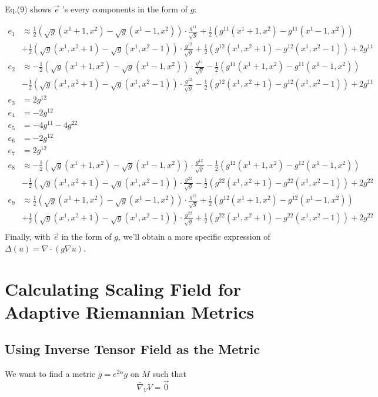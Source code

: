 \documentclass{article}
\theoremstyle{definition}
\theoremstyle{plain}
\begin{document}
Eq.(9) shows $\vec{e}$ 's every components in the form of $ g$:

\begin{align}
    e_1&\approx\frac{1}{2}(\sqrt{g}(x^1+1,x^2)-\sqrt{g}(x^1-1,x^2))\cdot\frac{g^{11}}{\sqrt{g}}+\frac{1}{2}(g^{11}(x^1+1,x^2)-g^{11}(x^1-1,x^2))\\ \nonumber
    &+\frac{1}{2}(\sqrt{g}(x^1,x^2+1)-\sqrt{g}(x^1,x^2-1))\cdot\frac{g^{12}}{\sqrt{g}}+\frac{1}{2}(g^{12}(x^1,x^2+1)-g^{12}(x^1,x^2-1))+2g^{11}\\ \nonumber
    e_2&\approx-\frac{1}{2}(\sqrt{g}(x^1+1,x^2)-\sqrt{g}(x^1-1,x^2))\cdot\frac{g^{11}}{\sqrt{g}}-\frac{1}{2}(g^{11}(x^1+1,x^2)-g^{11}(x^1-1,x^2))\\ \nonumber
    &-\frac{1}{2}(\sqrt{g}(x^1,x^2+1)-\sqrt{g}(x^1,x^2-1))\cdot\frac{g^{12}}{\sqrt{g}}-\frac{1}{2}(g^{12}(x^1,x^2+1)-g^{12}(x^1,x^2-1))+2g^{11}\\ \nonumber
    e_3&=2 g^{12}\\ \nonumber
    e_4&=-2 g^{12}\\ \nonumber
    e_5&=-4 g^{11}-4 g^{22}\\ \nonumber
    e_6&=-2 g^{12}\\ \nonumber
    e_7&=2 g^{12}\\ \nonumber
    e_8&\approx-\frac{1}{2}(\sqrt{g}(x^1+1,x^2)-\sqrt{g}(x^1-1,x^2))\cdot\frac{g^{12}}{\sqrt{g}}-\frac{1}{2}(g^{12}(x^1+1,x^2)-g^{12}(x^1-1,x^2))\\ \nonumber
    &-\frac{1}{2}(\sqrt{g}(x^1,x^2+1)-\sqrt{g}(x^1,x^2-1))\cdot\frac{g^{22}}{\sqrt{g}}-\frac{1}{2}(g^{22}(x^1,x^2+1)-g^{22}(x^1,x^2-1))+2g^{22}\\ \nonumber
    e_9&\approx\frac{1}{2}(\sqrt{g}(x^1+1,x^2)-\sqrt{g}(x^1-1,x^2))\cdot\frac{g^{12}}{\sqrt{g}}+\frac{1}{2}(g^{12}(x^1+1,x^2)-g^{12}(x^1-1,x^2))\\ \nonumber
    &+\frac{1}{2}(\sqrt{g}(x^1,x^2+1)-\sqrt{g}(x^1,x^2-1))\cdot\frac{g^{22}}{\sqrt{g}}+\frac{1}{2}(g^{22}(x^1,x^2+1)-g^{22}(x^1,x^2-1))+2g^{22}\\
\end{align}
Finally, with $\vec{e}$ in the form of $g$, we'll obtain a more specific expression of  $\Delta(u)=\nabla\cdot(g\nabla u)$.


\section{Calculating Scaling Field for Adaptive Riemannian Metrics\cite{hao2011adaptive}}
\subsection{Using Inverse Tensor Field as the Metric}
We want to find a metric $\bar{g}=e^{2\alpha}g$ on $M$ such that
\begin{equation}
    \bar{\nabla}_VV=\vec{0}
\end{equation}
\end{document}
